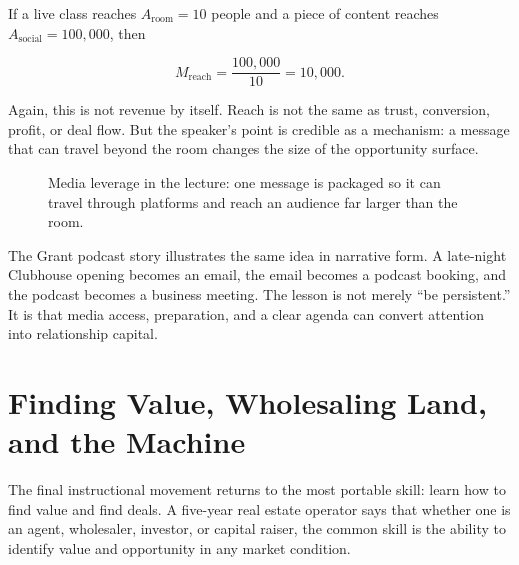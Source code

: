 If a live class reaches \(A_{\mathrm{room}}=10\) people and a piece of content reaches \(A_{\mathrm{social}}=100{,}000\), then

\begin{equation}
M_{\mathrm{reach}}
=
\frac{100{,}000}{10}
=
10{,}000.
\end{equation}

Again, this is not revenue by itself. Reach is not the same as trust, conversion, profit, or deal flow. But the speaker's point is credible as a mechanism: a message that can travel beyond the room changes the size of the opportunity surface.

\begin{figure}
\centering
{}
\caption{Media leverage in the lecture: one message is packaged so it can travel through platforms and reach an audience far larger than the room.}
\end{figure}

The Grant podcast story illustrates the same idea in narrative form. A late-night Clubhouse opening becomes an email, the email becomes a podcast booking, and the podcast becomes a business meeting. The lesson is not merely ``be persistent.'' It is that media access, preparation, and a clear agenda can convert attention into relationship capital.

\section{Finding Value, Wholesaling Land, and the Machine}

The final instructional movement returns to the most portable skill: learn how to find value and find deals. A five-year real estate operator says that whether one is an agent, wholesaler, investor, or capital raiser, the common skill is the ability to identify value and opportunity in any market condition.

